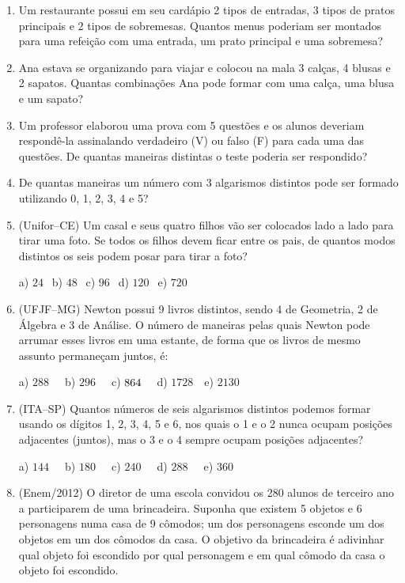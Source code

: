 \begin{multicols*}{2}
\begin{enumerate}
        \item Um restaurante possui em seu cardápio 2 tipos de entradas, 3 tipos de pratos principais e 2 tipos de sobremesas. Quantos menus poderiam ser montados para uma refeição com uma entrada, um prato principal e uma sobremesa?

        \item Ana estava se organizando para viajar e colocou na mala 3 calças, 4 blusas e 2 sapatos. Quantas combinações Ana pode formar com uma calça, uma blusa e um sapato?

        \item Um professor elaborou uma prova com 5 questões e os alunos deveriam respondê-la assinalando verdadeiro (V) ou falso (F) para cada uma das questões. De quantas maneiras distintas o teste poderia ser respondido?

        \item De quantas maneiras um número com 3 algarismos distintos pode ser formado utilizando 0, 1, 2, 3, 4 e 5?

        \item (Unifor–CE) Um casal e seus quatro filhos vão ser colocados lado a lado para tirar uma foto. Se todos os filhos devem ficar entre os pais, de quantos modos distintos os seis podem posar para tirar a foto?

              a) $24 \ \ $ b) $48 \ \ $ c) $96 \ \ $ d) $120 \ \ $ e) $720 \ \ $

        \item (UFJF–MG) Newton possui 9 livros distintos, sendo 4 de Geometria, 2 de Álgebra e 3 de Análise. O número de maneiras pelas quais Newton pode arrumar esses livros em uma estante, de forma que os livros de mesmo assunto permaneçam juntos, é:

              a) $288 \ \ \ \ \ $ b) $296 \ \ \ \ \ $ c) $864 \ \ \ \ \\ $ d) $1728 \ \ \ $ e) $2130 \ \ $

        \item (ITA–SP) Quantos números de seis algarismos distintos podemos formar usando os dígitos 1, 2, 3, 4, 5 e 6, nos quais o 1 e o 2 nunca ocupam posições adjacentes (juntos), mas o 3 e o 4 sempre ocupam posições adjacentes?

              a) $144 \ \ \ \ \ $ b) $180 \ \ \ \ \ $ c) $240 \ \ \ \ \ $ d) $288 \ \ \ \ \ $ e) $360 \ \ $

        \item (Enem/2012) O diretor de uma escola convidou os 280 alunos de terceiro ano a participarem de uma brincadeira. Suponha que existem 5 objetos e 6 personagens numa casa de 9 cômodos; um dos personagens esconde um dos objetos em um dos cômodos da casa. O objetivo da brincadeira é adivinhar qual objeto foi escondido por qual personagem e em qual cômodo da casa o objeto foi escondido.


\end{enumerate}
\end{multicols*}

